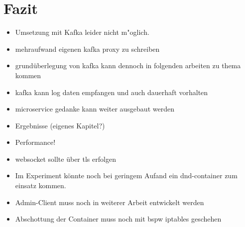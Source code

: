 \chapter{Fazit}
\begin{itemize}
  \item Umsetzung mit Kafka leider nicht m"oglich.
  \item mehraufwand eigenen kafka proxy zu schreiben
  \item grundüberlegung von kafka kann dennoch in folgenden arbeiten zu thema kommen
  \item kafka kann log daten empfangen und auch dauerhaft vorhalten
  \item microservice gedanke kann weiter ausgebaut werden
  \item Ergebnisse (eigenes Kapitel?)
  \item Performance!
  \item websocket sollte über tls erfolgen
  \item Im Experiment könnte noch bei geringem Aufand ein dnd-container zum einsatz kommen. 
  \item Admin-Client muss noch in weiterer Arbeit entwickelt werden
  \item Abschottung der Container muss noch mit bspw iptables geschehen
\end{itemize}
\clearpage
